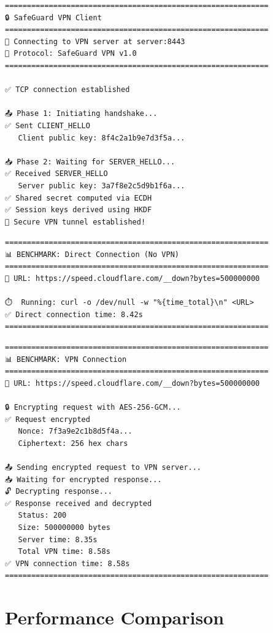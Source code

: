 \documentclass[12pt,a4paper]{article}
\begin{document}
\begin{lstlisting}[style=outputstyle, caption={VPN connection establishment}]
============================================================
🔒 SafeGuard VPN Client
============================================================
📡 Connecting to VPN server at server:8443
🔐 Protocol: SafeGuard VPN v1.0
============================================================

✅ TCP connection established

📤 Phase 1: Initiating handshake...
✅ Sent CLIENT_HELLO
   Client public key: 8f4c2a1b9e7d3f5a...

📥 Phase 2: Waiting for SERVER_HELLO...
✅ Received SERVER_HELLO
   Server public key: 3a7f8e2c5d9b1f6a...
✅ Shared secret computed via ECDH
✅ Session keys derived using HKDF
🔐 Secure VPN tunnel established!
\end{lstlisting}

\begin{lstlisting}[style=outputstyle, caption={Direct connection benchmark}]
============================================================
📊 BENCHMARK: Direct Connection (No VPN)
============================================================
📍 URL: https://speed.cloudflare.com/__down?bytes=500000000

⏱️  Running: curl -o /dev/null -w "%{time_total}\n" <URL>
✅ Direct connection time: 8.42s
============================================================
\end{lstlisting}

\begin{lstlisting}[style=outputstyle, caption={VPN connection benchmark}]
============================================================
📊 BENCHMARK: VPN Connection
============================================================
📍 URL: https://speed.cloudflare.com/__down?bytes=500000000

🔒 Encrypting request with AES-256-GCM...
✅ Request encrypted
   Nonce: 7f3a9e2c1b8d5f4a...
   Ciphertext: 256 hex chars

📤 Sending encrypted request to VPN server...
📥 Waiting for encrypted response...
🔓 Decrypting response...
✅ Response received and decrypted
   Status: 200
   Size: 500000000 bytes
   Server time: 8.35s
   Total VPN time: 8.58s
✅ VPN connection time: 8.58s
============================================================
\end{lstlisting}

\section{Performance Comparison}
\end{document}
